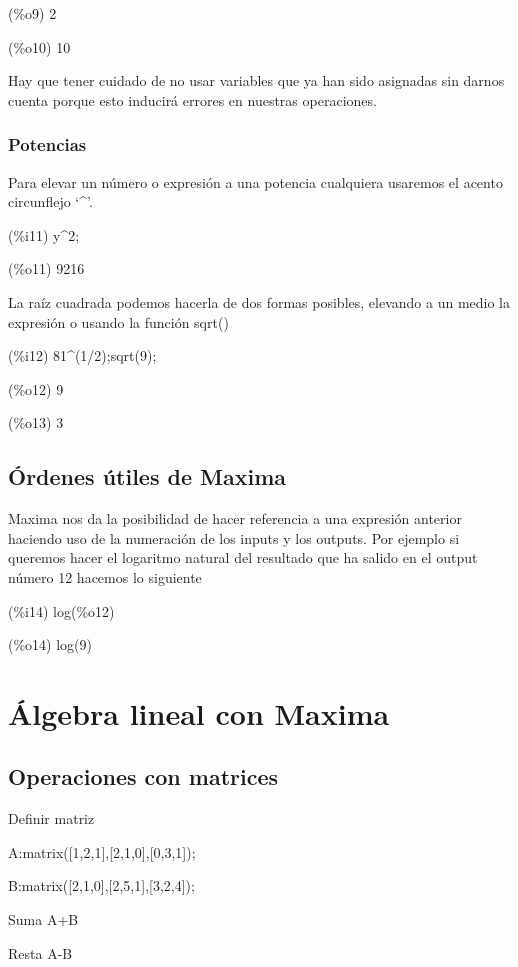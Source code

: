 \documentclass[a4paper, 12pt] {article}
\begin{document}
  (\%o9) 2

  (\%o10) 10

Hay que tener cuidado de no usar variables que ya han sido asignadas sin darnos cuenta porque esto inducirá errores en nuestras operaciones.
\pagebreak
\subsubsection{Potencias}
Para elevar un número o expresión a una potencia cualquiera usaremos el acento circunflejo `\^{}'.
\begin{center}

  (\%i11) y\^{}2;

  (\%o11) 9216

\end{center}
La raíz cuadrada podemos hacerla de dos formas posibles, elevando a un medio la expresión o usando la función sqrt()
\begin{center}
  (\%i12) 81\^{}(1/2);sqrt(9);

  (\%o12) 9

  (\%o13) 3
\end{center}

\subsection{Órdenes útiles de Maxima}
Maxima nos da la posibilidad de hacer referencia a una expresión anterior haciendo uso de la numeración de los inputs y los outputs. Por ejemplo si queremos hacer el logaritmo natural del resultado que ha salido en el output número 12 hacemos lo siguiente
\begin{center}
  (\%i14) log(\%o12)

  (\%o14) log(9)
\end{center}


\section{Álgebra lineal con Maxima}

\subsection{Operaciones con matrices}
Definir matriz

A:matrix([1,2,1],[2,1,0],[0,3,1]);

B:matrix([2,1,0],[2,5,1],[3,2,4]);

Suma A+B

Resta A-B
\end{document}
